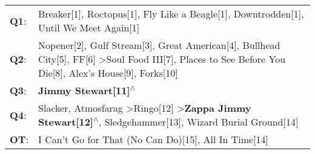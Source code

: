 \begin{supertabular}{p{0.03\textwidth}p{0.92\textwidth}}
 \textbf{Q1}:  &                                                                                                                                                                                               Breaker[1]\textsuperscript{}, \enspace Roctopus[1]\textsuperscript{}, \enspace Fly Like a Beagle[1]\textsuperscript{}, \enspace Downtrodden[1]\textsuperscript{}, \enspace Until We Meet Again[1]\textsuperscript{}  \enspace  \\
 \textbf{Q2}:  &  Nopener[2]\textsuperscript{}, \enspace Gulf Stream[3]\textsuperscript{}, \enspace Great American[4]\textsuperscript{}, \enspace Bullhead City[5]\textsuperscript{}, \enspace FF[6]\textsuperscript{} \textgreater \enspace Soul Food III[7]\textsuperscript{},  Places to See Before You Die[8]\textsuperscript{}, \enspace Alex's House[9]\textsuperscript{}, \enspace Forks[10]\textsuperscript{}  \enspace  \\
 \textbf{Q3}:  &                                                                                                                                                                                                                                                                                                                                                              \textbf{Jimmy Stewart[11]\textsuperscript{$\wedge$}}  \enspace  \\
 \textbf{Q4}:  &                                                                                                             Slacker\textsuperscript{}, \enspace Atmosfarag\textsuperscript{} \textgreater \enspace Ringo[12]\textsuperscript{} \textgreater \enspace \textbf{Zappa Jimmy Stewart[12]\textsuperscript{$\wedge$}}, \enspace Sledgehammer[13]\textsuperscript{}, \enspace Wizard Burial Ground[14]\textsuperscript{}  \enspace  \\
 \textbf{OT}:  &                                                                                                                                                                                                                                                                                                                 I Can't Go for That (No Can Do)[15]\textsuperscript{}, \enspace All In Time[14]\textsuperscript{}  \enspace  \\
\end{supertabular}
